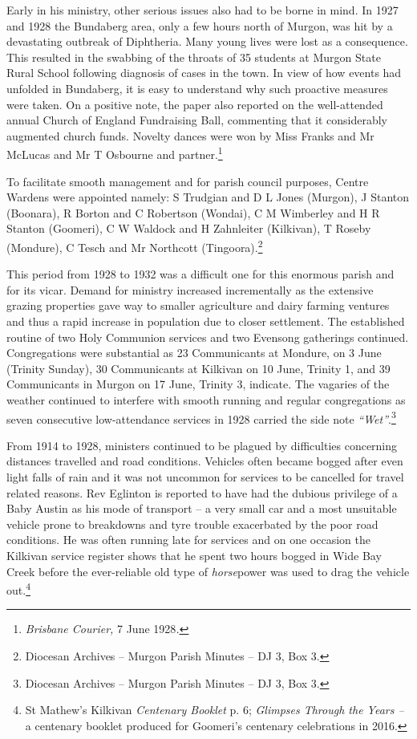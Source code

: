 Early in his ministry, other serious issues also had to be borne in mind. In 1927 and 1928 the Bundaberg area, only a few hours north of Murgon, was hit by a devastating outbreak of Diphtheria. Many young lives were lost as a consequence. This resulted in the swabbing of the throats of 35 students at Murgon State Rural School following diagnosis of cases in the town. In view of how events had unfolded in Bundaberg, it is easy to understand why such proactive measures were taken. On a positive note, the paper also reported on the well-attended annual Church of England Fundraising Ball, commenting that it considerably augmented church funds. Novelty dances were won by Miss Franks and Mr McLucas and Mr T Osbourne and partner.\footnote{\emph{Brisbane Courier,} 7 June 1928\emph{.}}


To facilitate smooth management and for parish council purposes, Centre Wardens were appointed namely: S Trudgian and D L Jones (Murgon), J Stanton (Boonara), R Borton and C Robertson (Wondai), C M Wimberley and H R Stanton (Goomeri), C W Waldock and H Zahnleiter (Kilkivan), T Roseby (Mondure), C Tesch and Mr Northcott (Tingoora).\footnote{Diocesan Archives -- Murgon Parish Minutes -- DJ 3, Box 3.}


This period from 1928 to 1932 was a difficult one for this enormous parish and for its vicar. Demand for ministry increased incrementally as the extensive grazing properties gave way to smaller agriculture and dairy farming ventures and thus a rapid increase in population due to closer settlement. The established routine of two Holy Communion services and two Evensong gatherings continued. Congregations were substantial as 23 Communicants at Mondure, on 3 June (Trinity Sunday), 30 Communicants at Kilkivan on 10 June, Trinity 1, and 39 Communicants in Murgon on 17 June, Trinity 3, indicate. The vagaries of the weather continued to interfere with smooth running and regular congregations as seven consecutive low-attendance services in 1928 carried the side note \emph{``Wet''}.\footnote{Diocesan Archives -- Murgon Parish Minutes -- DJ 3, Box 3.}


From 1914 to 1928, ministers continued to be plagued by difficulties concerning distances travelled and road conditions. Vehicles often became bogged after even light falls of rain and it was not uncommon for services to be cancelled for travel related reasons. Rev Eglinton is reported to have had the dubious privilege of a Baby Austin as his mode of transport -- a very small car and a most unsuitable vehicle prone to breakdowns and tyre trouble exacerbated by the poor road conditions. He was often running late for services and on one occasion the Kilkivan service register shows that he spent two hours bogged in Wide Bay Creek before the ever-reliable old type of \emph{horse}power was used to drag the vehicle out.\footnote{St Mathew's Kilkivan \emph{Centenary Booklet} p. 6; \emph{Glimpses Through the Years --} a centenary booklet produced for Goomeri's centenary celebrations in 2016.}








